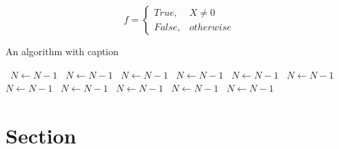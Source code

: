 \documentclass[a4paper]{article}
\begin{document}
\begin{equation}   f =
\begin{cases} True, & X \neq 0\\
False, & otherwise
\end{cases}
\end{equation}

\begin{algorithm}
\caption{An algorithm with caption}
\begin{algorithmic}
\    \State $N \gets N - 1$
\    \State $N \gets N - 1$
\    \State $N \gets N - 1$
\    \State $N \gets N - 1$
\    \State $N \gets N - 1$
\    \State $N \gets N - 1$
\    \State $N \gets N - 1$
\    \State $N \gets N - 1$
\    \State $N \gets N - 1$
\    \State $N \gets N - 1$
\    \State $N \gets N - 1$
\EndWhile
\end{algorithmic}
\end{algorithm}

\section{Section}
\end{document}
